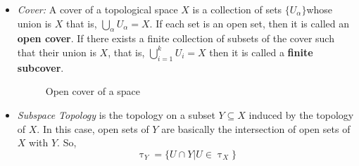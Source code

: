\begin{itemize}
    \item \textit{Cover:} A cover of a topological space $X$ is a collection of sets $\{U_\alpha \}$whose union is $X$ that is, $\bigcup\limits_\alpha U_\alpha = X$. If each set is an open set, then it is called an \textbf{open cover}. If there exists a finite collection of subsets of the cover such that their union is $X$, that is, $\bigcup\limits_{i=1}^k U_i = X$ then it is called a \textbf{finite subcover}.
    \begin{figure}[H]
    \centering
    
    \caption{Open cover of a space}
  \end{figure}
  \item \textit{Subspace Topology }is the topology on a subset $Y\subseteq X$ induced by the topology of $X$. In this case, open sets of $Y$ are basically the intersection of open sets of $X$ with $Y$. So,
  $$\uptau_Y = \{U\cap Y| U\in \uptau_X\}$$
  \end{itemize}
